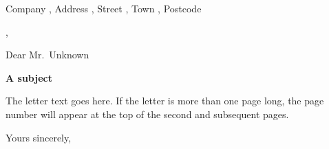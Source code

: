 \documentclass[12pt,a4paper]{letter}
\date{\today} %
\makeatletter
\newcommand{\subject}[1]{%
  {\begin{center} \bfseries #1 \end{center}}%
}
\renewcommand*{\opening}[1]{%
  \vspace{2\parskip}%
  {\raggedright \toname \\ \toaddress \par}%
  {\raggedright\@date\par}%
  \vspace{2\parskip}%
  #1\par\nobreak    %
}
\renewcommand*{\\}{\unskip,\space\ignorespaces}%
\makeatother
\begin{document}
\begin{letter}{%
  Company  \\
  Address  \\
  Street   \\
  Town     \\
  Postcode
}

\opening{Dear Mr.~Unknown} %

\subject{A subject} %

The letter text goes here. If the letter is more than one page long, the
page number will appear at the top of the second and subsequent pages.

\closing{Yours sincerely,} %
\end{letter}
\end{document}
